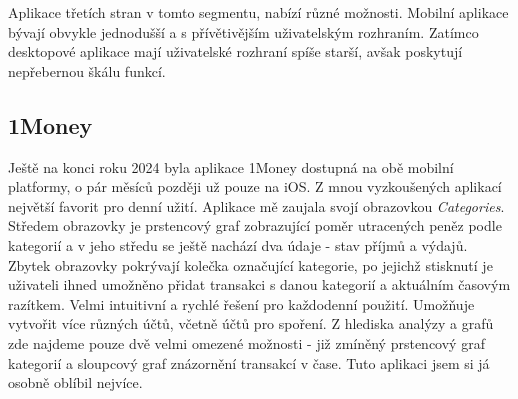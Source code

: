 \documentclass[
  biblatex,
  figures=true,
  tables=false,
  glossaries,
  index
]{kidiplom}
\begin{document}
Aplikace třetích stran v tomto segmentu, nabízí různé možnosti. Mobilní aplikace bývají obvykle jednodušší a s přívětivějším uživatelským rozhraním. Zatímco desktopové aplikace mají uživatelské rozhraní spíše starší, avšak poskytují nepřebernou škálu funkcí.

\subsection{1Money}
Ještě na konci roku 2024 byla aplikace 1Money dostupná na obě mobilní platformy, o pár měsíců později už pouze na iOS. Z mnou vyzkoušených aplikací největší favorit pro denní užití. Aplikace mě zaujala svojí obrazovkou \textit{Categories}.  Středem obrazovky je prstencový graf zobrazující poměr utracených peněz podle kategorií a v jeho středu se ještě nachází dva údaje - stav příjmů a výdajů. Zbytek obrazovky pokrývají kolečka označující kategorie, po jejichž stisknutí je uživateli ihned umožněno přidat transakci s danou kategorií a aktuálním časovým razítkem. Velmi intuitivní a rychlé řešení pro každodenní použití. Umožňuje vytvořit více různých účtů, včetně účtů pro spoření. Z hlediska analýzy a grafů zde najdeme pouze dvě velmi omezené možnosti - již zmíněný prstencový graf kategorií a sloupcový graf znázornění transakcí v čase. Tuto aplikaci jsem si já osobně oblíbil nejvíce.
\end{document}
